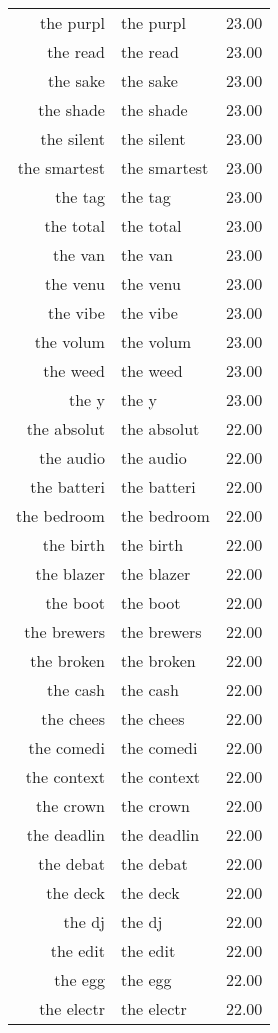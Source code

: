 \begin{table}[ht]
\begin{tabular}{rlr}
  the purpl & the purpl & 23.00 \\ 
  the read & the read & 23.00 \\ 
  the sake & the sake & 23.00 \\ 
  the shade & the shade & 23.00 \\ 
  the silent & the silent & 23.00 \\ 
  the smartest & the smartest & 23.00 \\ 
  the tag & the tag & 23.00 \\ 
  the total & the total & 23.00 \\ 
  the van & the van & 23.00 \\ 
  the venu & the venu & 23.00 \\ 
  the vibe & the vibe & 23.00 \\ 
  the volum & the volum & 23.00 \\ 
  the weed & the weed & 23.00 \\ 
  the y & the y & 23.00 \\ 
  the absolut & the absolut & 22.00 \\ 
  the audio & the audio & 22.00 \\ 
  the batteri & the batteri & 22.00 \\ 
  the bedroom & the bedroom & 22.00 \\ 
  the birth & the birth & 22.00 \\ 
  the blazer & the blazer & 22.00 \\ 
  the boot & the boot & 22.00 \\ 
  the brewers & the brewers & 22.00 \\ 
  the broken & the broken & 22.00 \\ 
  the cash & the cash & 22.00 \\ 
  the chees & the chees & 22.00 \\ 
  the comedi & the comedi & 22.00 \\ 
  the context & the context & 22.00 \\ 
  the crown & the crown & 22.00 \\ 
  the deadlin & the deadlin & 22.00 \\ 
  the debat & the debat & 22.00 \\ 
  the deck & the deck & 22.00 \\ 
  the dj & the dj & 22.00 \\ 
  the edit & the edit & 22.00 \\ 
  the egg & the egg & 22.00 \\ 
  the electr & the electr & 22.00 \\ 

\end{tabular}
\end{table}
